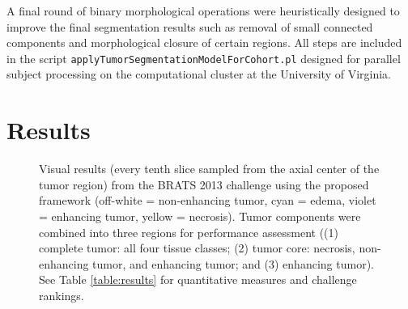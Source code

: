 A final round of binary morphological operations were heuristically designed
to improve the final segmentation results such as removal of small connected 
components and morphological closure of certain regions.
All steps are included in the script 
{\tt applyTumorSegmentationModelForCohort.pl} designed for parallel subject 
processing on the computational cluster at the University of Virginia.




%
%

\section{Results}


\begin{figure}
  \vspace{-20mm}
  \caption{Visual results (every tenth slice sampled from the axial center of the
  tumor region) from the BRATS 2013 challenge using the proposed
  framework (off-white = non-enhancing tumor, cyan = edema, violet = enhancing 
  tumor, yellow = necrosis).  Tumor components were combined into
  three regions for performance assessment ((1) complete tumor: all four tissue
  classes; (2) tumor core:  necrosis, non-enhancing tumor, and enhancing tumor;
  and (3) enhancing tumor).  See Table \ref{table:results} for quantitative measures
  and challenge rankings.
  }
  \label{fig:challengeresults}
\end{figure}






